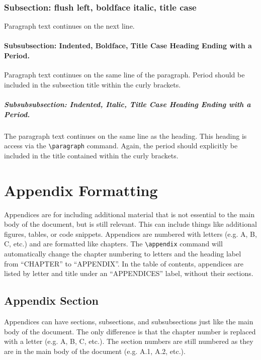 \documentclass{thesis-dissertation}
\begin{document}
\subsection{Subsection: flush left, boldface italic, title case}
Paragraph text continues on the next line.

\subsubsection{Subsubsection: Indented, Boldface, Title Case Heading Ending with a Period.}
Paragraph text continues on the same line of the paragraph. Period should be included in the subsection title within the curly brackets.

\paragraph{Subsubsubsection: Indented, Italic, Title Case Heading Ending with a Period.} The paragraph text continues on the same line as the heading. This heading is access via the \verb|\paragraph| command. Again, the period should explicitly be included in the title contained within the curly brackets.

\backmatter
\begingroup
\singlespacing
\setlength{\bibitemsep}{\baselineskip}
\printbibliography[heading=bibintoc]
\endgroup
\doublespacing

\appendix
\chapter{Appendix Formatting}
Appendices are for including additional material that is not essential to the main body of the document, but is still relevant. This can include things like additional figures, tables, or code snippets. Appendices are numbered with letters (e.g. A, B, C, etc.) and are formatted like chapters. The \verb|\appendix| command will automatically change the chapter numbering to letters and the heading label from ``CHAPTER'' to ``APPENDIX''. In the table of contents, appendices are listed by letter and title under an ``APPENDICES'' label, without their sections.
\section{Appendix Section}
Appendices can have sections, subsections, and subsubsections just like the main body of the document. The only difference is that the chapter number is replaced with a letter (e.g. A, B, C, etc.). The section numbers are still numbered as they are in the main body of the document (e.g. A.1, A.2, etc.).
\end{document}
